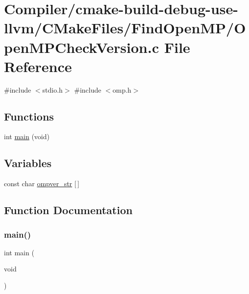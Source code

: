 \hypertarget{use-llvm_2_c_make_files_2_find_open_m_p_2_open_m_p_check_version_8c}{}\section{Compiler/cmake-\/build-\/debug-\/use-\/llvm/\+C\+Make\+Files/\+Find\+Open\+M\+P/\+Open\+M\+P\+Check\+Version.c File Reference}
\label{use-llvm_2_c_make_files_2_find_open_m_p_2_open_m_p_check_version_8c}
{\ttfamily \#include $<$stdio.\+h$>$}\newline
{\ttfamily \#include $<$omp.\+h$>$}\newline
\subsection*{Functions}
\begin{DoxyCompactItemize}
\item 
int \mbox{\hyperlink{use-llvm_2_c_make_files_2_find_open_m_p_2_open_m_p_check_version_8c_a840291bc02cba5474a4cb46a9b9566fe}{main}} (void)
\end{DoxyCompactItemize}
\subsection*{Variables}
\begin{DoxyCompactItemize}
\item 
const char \mbox{\hyperlink{use-llvm_2_c_make_files_2_find_open_m_p_2_open_m_p_check_version_8c_af60b110d3c4507a1d6ffd66d846f1c58}{ompver\+\_\+str}} \mbox{[}$\,$\mbox{]}
\end{DoxyCompactItemize}


\subsection{Function Documentation}
\mbox{\label{use-llvm_2_c_make_files_2_find_open_m_p_2_open_m_p_check_version_8c_a840291bc02cba5474a4cb46a9b9566fe}} 
\subsubsection{\texorpdfstring{main()}{main()}}
{\footnotesize\ttfamily int main (\begin{DoxyParamCaption}\item[{void}]{ }\end{DoxyParamCaption})}



